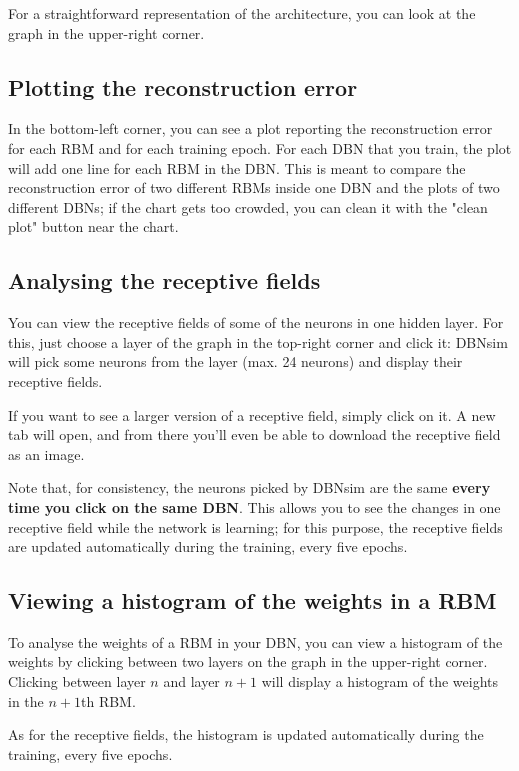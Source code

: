 \documentclass[a4paper]{article}
\begin{document}
		
For a straightforward representation of the architecture, you can look at the graph in the upper-right corner.

		
	\subsection{Plotting the reconstruction error}

		
In the bottom-left corner, you can see a plot reporting the reconstruction error for each RBM and for each training epoch. For each DBN that you train, the plot will add one line for each RBM in the DBN. This is meant to compare the reconstruction error of two different RBMs inside one DBN and the plots of two different DBNs; if the chart gets too crowded, you can clean it with the "clean plot" button near the chart.

		
	\subsection{Analysing the receptive fields}

		
You can view the receptive fields of some of the neurons in one hidden layer. For this, just choose a layer of the graph in the top-right corner and click it: DBNsim will pick some neurons from the layer (max. 24 neurons) and display their receptive fields.
		
If you want to see a larger version of a receptive field, simply click on it. A new tab will open, and from there you'll even be able to download the receptive field as an image.
		
Note that, for consistency, the neurons picked by DBNsim are the same \textbf{every time you click on the same DBN}. This allows you to see the changes in one receptive field while the network is learning; for this purpose, the receptive fields are updated automatically during the training, every five epochs.

		
	\subsection{Viewing a histogram of the weights in a RBM}

		
To analyse the weights of a RBM in your DBN, you can view a histogram of the weights by clicking between two layers on the graph in the upper-right corner. Clicking between layer $n$ and layer $n+1$ will display a histogram of the weights in the $n+1$th RBM.
		
As for the receptive fields, the histogram is updated automatically during the training, every five epochs.
\end{document}
